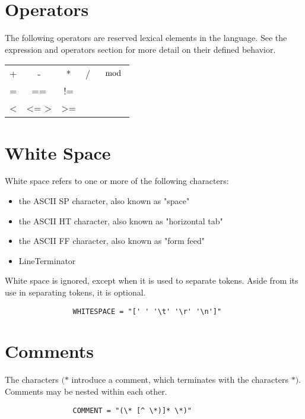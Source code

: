 \begin{homeworkProblem}
	\section{Operators}
	The following operators are reserved lexical elements in the language. See the expression and operators section for more detail on their defined behavior.
	\begin{center}
		\begin{tabular}{ccccc}
			+ & - & * & / & $\mod$ \\
			= & == & != \\
			\textless & \textless=    \textgreater & \textgreater= 
		\end{tabular}
	\end{center}
 	
	\section{White Space}
	White space refers to one or more of the following characters:
	\begin{itemize}
		\item the ASCII SP character, also known as "space"
		\item the ASCII HT character, also known as "horizontal tab"
		\item the ASCII FF character, also known as "form feed"
		\item LineTerminator
	\end{itemize}
	White space is ignored, except when it is used to separate tokens. Aside from its use in separating tokens, it is optional.
    \begin{verbatim}
				WHITESPACE = "[' ' '\t' '\r' '\n']"
 	\end{verbatim}
	
	\section{Comments}
    The characters $(*$ introduce a comment, which terminates with the characters $*)$. Comments may be nested within each other.
	\begin{verbatim}
				COMMENT = "(\* [^ \*)]* \*)"
	\end{verbatim}

\end{homeworkProblem}
